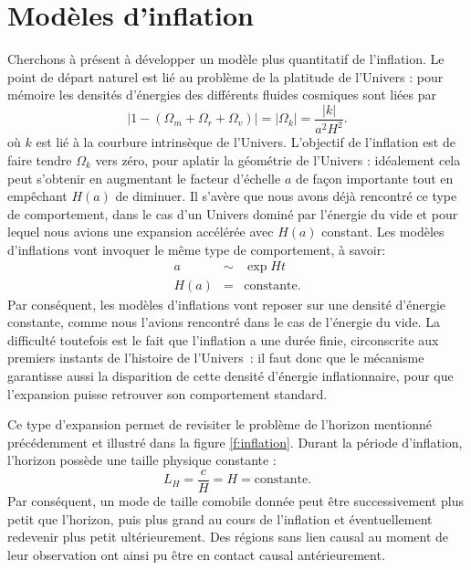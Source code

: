 \section{Modèles d'inflation}
Cherchons à présent à développer un modèle plus quantitatif de l'inflation. Le point de départ naturel est lié au problème de la platitude de l'Univers : pour mémoire les densités d'énergies des différents fluides cosmiques sont liées par 
\begin{equation}
|1-(\Omega_m+\Omega_r+\Omega_v)|=|\Omega_k|=\frac{|k|}{a^2H^2}.
\end{equation}
où $k$ est lié à la courbure intrinsèque de l'Univers. L'objectif de l'inflation est de faire tendre $\Omega_k$ vers zéro, pour aplatir la géométrie de l'Univers : idéalement cela peut s'obtenir en augmentant le facteur d'échelle $a$ de façon importante tout en empêchant $H(a)$ de diminuer. Il s'avère que nous avons déjà rencontré ce type de comportement, dans le cas d'un Univers dominé par l'énergie du vide et pour lequel nous avions une expansion accélérée avec $H(a)$ constant. Les modèles d'inflations vont invoquer le même type de comportement, à savoir:
\begin{eqnarray}
a&\sim&\exp{Ht}\\
H(a)&=&\mathrm{constante}.
\end{eqnarray} 
Par conséquent, les modèles d'inflations vont reposer sur une densité d'énergie constante, comme nous l'avions rencontré dans le cas de l'énergie du vide. La difficulté toutefois est le fait que l'inflation a une durée finie, circonscrite aux premiers instants de l'histoire de l'Univers~: il faut donc que le mécanisme garantisse aussi la disparition de cette densité d'énergie inflationnaire, pour que l'expansion puisse retrouver son comportement standard.

Ce type d'expansion permet de revisiter le problème de l'horizon mentionné précédemment et illustré dans la figure \ref{f:inflation}. Durant la période d'inflation, l'horizon possède une taille physique constante :
\begin{equation}
L_H=\frac{c}{H}=H=\mathrm{constante}.
\end{equation}
Par conséquent, un mode de taille comobile donnée peut être successivement plus petit que l'horizon, puis plus grand au cours de l'inflation et éventuellement redevenir plus petit ultérieurement. Des régions sans lien causal au moment de leur observation ont ainsi pu être en contact causal antérieurement.


